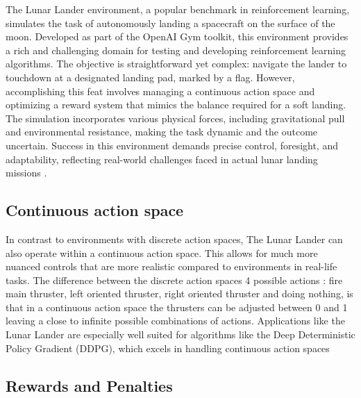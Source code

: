 \documentclass[conference]{IEEEtran}
\begin{document}
The Lunar Lander environment, a popular benchmark in reinforcement learning, simulates the task of autonomously landing a spacecraft on the surface of the moon. Developed as part of the OpenAI Gym toolkit, this environment provides a rich and challenging domain for testing and developing reinforcement learning algorithms. The objective is straightforward yet complex: navigate the lander to touchdown at a designated landing pad, marked by a flag. However, accomplishing this feat involves managing a continuous action space and optimizing a reward system that mimics the balance required for a soft landing. The simulation incorporates various physical forces, including gravitational pull and environmental resistance, making the task dynamic and the outcome uncertain. Success in this environment demands precise control, foresight, and adaptability, reflecting real-world challenges faced in actual lunar landing missions \cite{palanisamy2018hands}.

\subsection{Continuous action space}
In contrast to environments with discrete action spaces, The Lunar Lander can also operate within a continuous action space. This allows for much more nuanced controls that are more realistic compared to environments in real-life tasks. The difference between the discrete action spaces 4 possible actions : fire main thruster, left oriented thruster, right oriented thruster and doing nothing, is that in a continuous action space the thrusters can be adjusted between 0 and 1 leaving a close to infinite possible combinations of actions. Applications like the Lunar Lander are especially well suited for algorithms like the Deep Deterministic Policy Gradient (DDPG), which excels in handling continuous action spaces \cite{Gjersvik2019LandingMoon}

\subsection{Rewards and Penalties}
\end{document}
